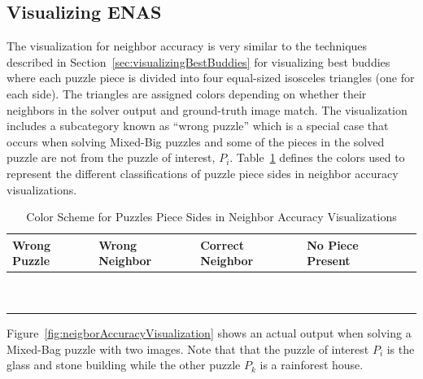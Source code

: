 \subsection{Visualizing ENAS}\label{sec:visualizingNeighborAccuracy}

The visualization for neighbor accuracy is very similar to the techniques described in Section~\ref{sec:visualizingBestBuddies} for visualizing best buddies where each puzzle piece is divided into four equal-sized isosceles triangles (one for each side).  The triangles are assigned colors depending on whether their neighbors in the solver output and ground-truth image match.  The visualization includes a subcategory known as ``wrong puzzle'' which is a special case that occurs when solving Mixed-Big puzzles and some of the pieces in the solved puzzle are not from the puzzle of interest, $P_i$.  Table~\ref{tab:neighborAccuracyColors} defines the colors used to represent the different classifications of puzzle piece sides in neighbor accuracy visualizations.

\begin{table}[htb]
\begin{center}
  \begin{tabular}{ | >{\centering\arraybackslash}m{0.9in} | >{\centering\arraybackslash}m{0.9in} | >{\centering\arraybackslash}m{0.9in} | >{\centering\arraybackslash}m{0.9in} | >{\centering\arraybackslash}m{0.9in} | }
 \hline
    Wrong Puzzle & Wrong Neighbor & Correct Neighbor  & No Piece Present  \\ \hline
	{\cellcolor{blue}~} & {\cellcolor{red}~} & {\cellcolor{green}~} & {\cellcolor{black}~}  \\
	{\cellcolor{blue}~} & {\cellcolor{red}~} & {\cellcolor{green}~} & {\cellcolor{black}~}  \\
 \hline
  \end{tabular}
\end{center}
\caption{Color Scheme for Puzzles Piece Sides in Neighbor Accuracy Visualizations}\label{tab:neighborAccuracyColors}
\end{table}

Figure~\ref{fig:neigborAccuracyVisualization} shows an actual output when solving a Mixed-Bag puzzle with two images.  Note that that the puzzle of interest $P_i$ is the glass and stone building while the other puzzle $P_k$ is a rainforest house.


